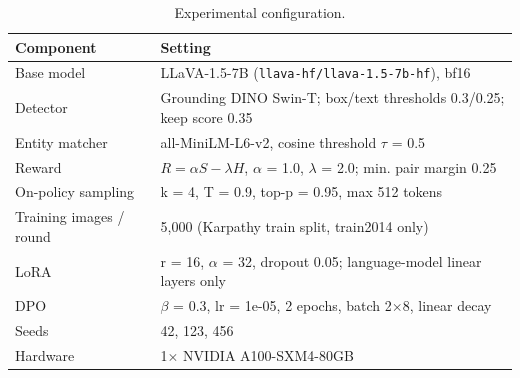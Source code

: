 \begin{table}[t]
\centering
\small
\caption{Experimental configuration.}
\label{tab:setup}
\begin{tabular}{lp{11cm}}
\toprule
Component & Setting \\
\midrule
Base model & LLaVA-1.5-7B (\texttt{llava-hf/llava-1.5-7b-hf}), bf16 \\
Detector & Grounding DINO Swin-T; box/text thresholds 0.3/0.25; keep score 0.35 \\
Entity matcher & all-MiniLM-L6-v2, cosine threshold $\tau$ = 0.5 \\
Reward & $R=\alpha S-\lambda H$, $\alpha$ = 1.0, $\lambda$ = 2.0; min. pair margin 0.25 \\
On-policy sampling & k = 4, T = 0.9, top-p = 0.95, max 512 tokens \\
Training images / round & 5,000 (Karpathy train split, train2014 only) \\
LoRA & r = 16, $\alpha$ = 32, dropout 0.05; language-model linear layers only \\
DPO & $\beta$ = 0.3, lr = 1e-05, 2 epochs, batch 2$\times$8, linear decay \\
Seeds & 42, 123, 456 \\
Hardware & 1$\times$ NVIDIA A100-SXM4-80GB \\
\bottomrule
\end{tabular}
\end{table}
